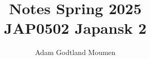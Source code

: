 \documentclass[11pt,a4paper]{article}
\title{Notes Spring 2025\\ \normalsize JAP0502 Japansk 2}
\author{Adam Godtland Moumen}
\begin{document}
\setlength{\parindent}{0cm}

\begin{titlepage}
    \maketitle
\end{titlepage}
\tableofcontents
\clearpage
{}



\end{document}
